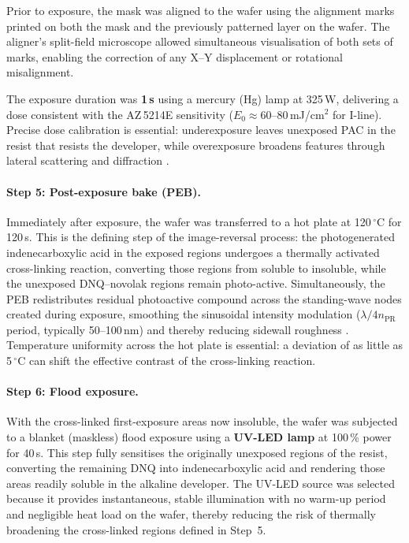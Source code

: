 Prior to exposure, the mask was aligned to the wafer using the alignment marks
printed on both the mask and the previously patterned layer on the wafer. The
aligner's split-field microscope allowed simultaneous visualisation
of both sets of
marks, enabling the correction of any X--Y displacement or rotational
misalignment.

The exposure duration was \textbf{1\,s} using a mercury (Hg) lamp at 325\,W,
delivering a dose consistent with the AZ\,5214E sensitivity
($E_0 \approx 60$--$80$\,mJ/cm$^2$ for I-line). Precise dose
calibration is essential: underexposure leaves unexposed
PAC in the resist that resists the developer, while overexposure
broadens features
through lateral scattering and diffraction \cite{FundTechProc2024}.


\paragraph{Step 5: Post-exposure bake (PEB).}
Immediately after exposure, the wafer was transferred to a hot plate at
120\,$^\circ$C for 120\,s. This is the defining step of the
image-reversal process:
the photogenerated indenecarboxylic acid in the exposed regions undergoes a
thermally activated cross-linking reaction, converting those regions
from soluble to
insoluble, while the unexposed DNQ--novolak regions remain photo-active.
Simultaneously, the PEB redistributes residual photoactive compound across the
standing-wave nodes created during exposure, smoothing the sinusoidal intensity
modulation ($\lambda / 4n_\text{PR}$ period, typically 50--100\,nm) and thereby
reducing sidewall roughness \cite{FundTechProc2024}. Temperature
uniformity across
the hot plate is essential: a deviation of as little as 5\,$^\circ$C
can shift the
effective contrast of the cross-linking reaction.

\paragraph{Step 6: Flood exposure.}
With the cross-linked first-exposure areas now insoluble, the wafer
was subjected to
a blanket (maskless) flood exposure using a \textbf{UV-LED lamp} at
100\,\% power
for 40\,s. This step fully sensitises the originally unexposed regions of the
resist, converting the remaining DNQ into indenecarboxylic acid and
rendering those
areas readily soluble in the alkaline developer. The UV-LED source was selected
because it provides instantaneous, stable illumination with no
warm-up period and
negligible heat load on the wafer, thereby reducing the risk of
thermally broadening
the cross-linked regions defined in Step~5.

